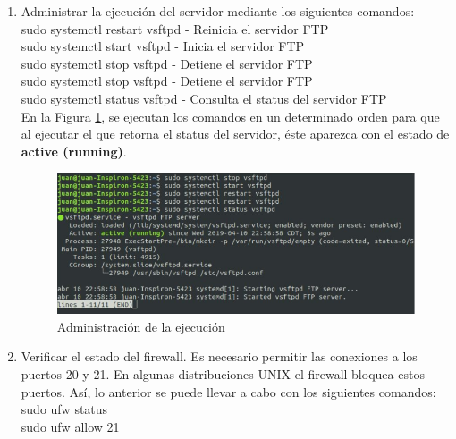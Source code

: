 \begin{enumerate}
    \item Administrar la ejecución del servidor mediante los siguientes comandos:\\
    
    sudo systemctl restart vsftpd - Reinicia el servidor FTP\\
    
    sudo systemctl start vsftpd - Inicia el servidor FTP\\
    
    sudo systemctl stop vsftpd - Detiene el servidor FTP\\
    
    sudo systemctl stop vsftpd - Detiene el servidor FTP\\
    
    sudo systemctl status vsftpd - Consulta el status del servidor FTP\\
    
    En la Figura \ref{fig:ftp3}, se ejecutan los comandos en un determinado orden para que al ejecutar el que retorna el status del servidor, éste aparezca con el estado de \textbf{active (running)}. 
    
    \begin{figure}[H]
        \centering
        \includegraphics[scale=.80]{imagenes/primero/paso3_ftp.PNG}
        \caption{Administración de la ejecución}
        \label{fig:ftp3}
    \end{figure}
    
    \item Verificar el estado del firewall. Es necesario permitir las conexiones a los puertos 20 y 21. En algunas distribuciones UNIX el firewall bloquea estos puertos. Así, lo anterior se puede llevar a cabo con los siguientes comandos:\\
    
    sudo ufw status\\
    
    sudo ufw allow 21\\
    

\end{enumerate}
